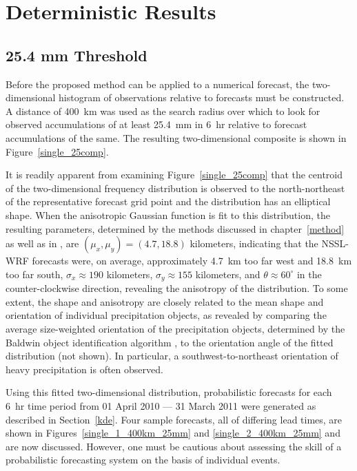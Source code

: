 

\section{Deterministic Results}
\label{dresults}




\subsection{25.4 mm Threshold}
\label{dresults_25.4mm}

Before the proposed method can be applied to a numerical forecast, the two-dimensional histogram of observations relative to forecasts must be constructed.
A distance of \mbox{400 km} was used as the search radius over which to look for observed accumulations of at least \mbox{25.4 mm} in \mbox{6 hr} relative to forecast accumulations of the same.
The resulting two-dimensional composite is shown in \mbox{Figure \ref{single_25comp}}.


It is readily apparent from examining \mbox{Figure \ref{single_25comp}} that the centroid of the two-dimensional frequency distribution is observed to the north-northeast of the representative forecast grid point and the distribution has an elliptical shape.
When the anisotropic Gaussian function is fit to this distribution, the resulting parameters, determined by the methods discussed in \mbox{chapter \ref{method}} as well as in \cite{Lak2010}, are $(\mu_x, \mu_y) = (4.7, 18.8)$ kilometers, indicating that the NSSL-WRF forecasts were, on average, approximately \mbox{4.7 km} too far west and \mbox{18.8 km} too far south, $\sigma_x \approx 190$ kilometers, $\sigma_y \approx 155$ kilometers, and $\theta \approx 60^{\circ}$ in the counter-clockwise direction, revealing the anisotropy of the distribution.
To some extent, the shape and anisotropy are closely related to the mean shape and orientation of individual precipitation objects, as revealed by comparing the average size-weighted orientation of the precipitation objects, determined by the Baldwin object identification algorithm \citep{Baldwin2005}, to the orientation angle of the fitted distribution (not shown).
In particular, a southwest-to-northeast orientation of heavy precipitation is often observed.


Using this fitted two-dimensional distribution, probabilistic forecasts for each \mbox{6 hr} time period from 01 April 2010 --- 31 March 2011 were generated as described in \mbox{Section \ref{kde}}.
Four sample forecasts, all of differing lead times, are shown in \mbox{Figures \ref{single_1_400km_25mm}} and \ref{single_2_400km_25mm} and are now discussed.
However, one must be cautious about assessing the skill of a probabilistic forecasting system on the basis of individual events.


